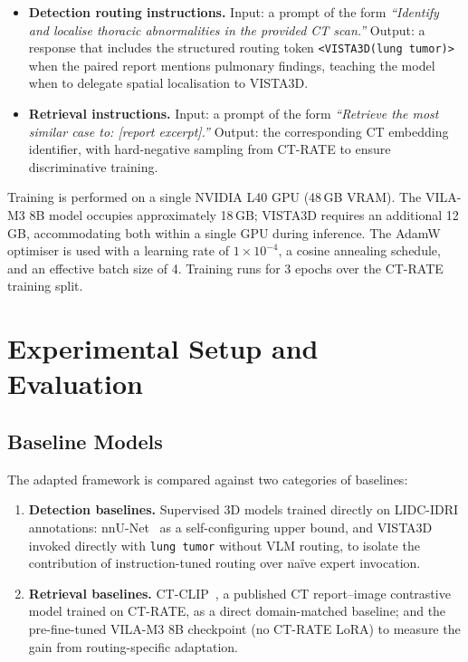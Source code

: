\documentclass{iopconfser}
\begin{document}
\begin{itemize}
  \item \textbf{Detection routing instructions.} Input: a prompt of the form
    \textit{``Identify and localise thoracic abnormalities in the provided CT
    scan.''} Output: a response that includes the structured routing token
    \texttt{<VISTA3D(lung tumor)>} when the paired report mentions pulmonary
    findings, teaching the model when to delegate spatial localisation to VISTA3D.

  \item \textbf{Retrieval instructions.} Input: a prompt of the form
    \textit{``Retrieve the most similar case to: [report excerpt].''} Output:
    the corresponding CT embedding identifier, with hard-negative sampling
    from CT-RATE to ensure discriminative training.
\end{itemize}

Training is performed on a single NVIDIA L40 GPU (48\,GB VRAM). The VILA-M3
8B model occupies approximately 18\,GB; VISTA3D requires an additional 12\,GB,
accommodating both within a single GPU during inference. The AdamW optimiser is
used with a learning rate of $1 \times 10^{-4}$, a cosine annealing schedule,
and an effective batch size of 4. Training runs for 3 epochs over the CT-RATE
training split.


\section{Experimental Setup and Evaluation}

\subsection{Baseline Models}

The adapted framework is compared against two categories of baselines:

\begin{enumerate}
  \item \textbf{Detection baselines.} Supervised 3D models trained directly on
    LIDC-IDRI annotations: nnU-Net~\cite{nnunet2021} as a self-configuring
    upper bound, and VISTA3D invoked directly with \texttt{lung tumor} without
    VLM routing, to isolate the contribution of instruction-tuned routing over
    na\"ive expert invocation.

  \item \textbf{Retrieval baselines.} CT-CLIP~\cite{ctrate2024}, a published
    CT report--image contrastive model trained on CT-RATE, as a direct
    domain-matched baseline; and the pre-fine-tuned VILA-M3 8B checkpoint
    (no CT-RATE LoRA) to measure the gain from routing-specific adaptation.
\end{enumerate}
\end{document}
